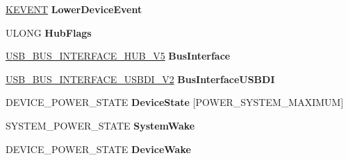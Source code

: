 \begin{DoxyCompactItemize}
\item 
\mbox{\label{struct___u_s_b_h_u_b___f_d_o___e_x_t_e_n_s_i_o_n_a5c8c0a3416b3a681da155dfb287c04f3}} 
\hyperlink{struct___k_e_v_e_n_t}{K\+E\+V\+E\+NT} {\bfseries Lower\+Device\+Event}
\item 
\mbox{\label{struct___u_s_b_h_u_b___f_d_o___e_x_t_e_n_s_i_o_n_ae3d645f0b369886e648f00e9a1433f49}} 
U\+L\+O\+NG {\bfseries Hub\+Flags}
\item 
\mbox{\label{struct___u_s_b_h_u_b___f_d_o___e_x_t_e_n_s_i_o_n_a7f856dc75099d942348ae2af3d2bdf40}} 
\hyperlink{struct___u_s_b___b_u_s___i_n_t_e_r_f_a_c_e___h_u_b___v5}{U\+S\+B\+\_\+\+B\+U\+S\+\_\+\+I\+N\+T\+E\+R\+F\+A\+C\+E\+\_\+\+H\+U\+B\+\_\+\+V5} {\bfseries Bus\+Interface}
\item 
\mbox{\label{struct___u_s_b_h_u_b___f_d_o___e_x_t_e_n_s_i_o_n_a279a7d396328a0efa01a7511ebd47196}} 
\hyperlink{struct___u_s_b___b_u_s___i_n_t_e_r_f_a_c_e___u_s_b_d_i___v2}{U\+S\+B\+\_\+\+B\+U\+S\+\_\+\+I\+N\+T\+E\+R\+F\+A\+C\+E\+\_\+\+U\+S\+B\+D\+I\+\_\+\+V2} {\bfseries Bus\+Interface\+U\+S\+B\+DI}
\item 
\mbox{\label{struct___u_s_b_h_u_b___f_d_o___e_x_t_e_n_s_i_o_n_af2c15a18f9bafb9719e844161cf87b50}} 
D\+E\+V\+I\+C\+E\+\_\+\+P\+O\+W\+E\+R\+\_\+\+S\+T\+A\+TE {\bfseries Device\+State} \mbox{[}P\+O\+W\+E\+R\+\_\+\+S\+Y\+S\+T\+E\+M\+\_\+\+M\+A\+X\+I\+M\+UM\mbox{]}
\item 
\mbox{\label{struct___u_s_b_h_u_b___f_d_o___e_x_t_e_n_s_i_o_n_a5c94c17c707d092c0b9f2a528a721b06}} 
S\+Y\+S\+T\+E\+M\+\_\+\+P\+O\+W\+E\+R\+\_\+\+S\+T\+A\+TE {\bfseries System\+Wake}
\item 
\mbox{\label{struct___u_s_b_h_u_b___f_d_o___e_x_t_e_n_s_i_o_n_a6c2299a89d8181d989f0dc2e2dcc3a4a}} 
D\+E\+V\+I\+C\+E\+\_\+\+P\+O\+W\+E\+R\+\_\+\+S\+T\+A\+TE {\bfseries Device\+Wake}
\item 
\mbox{\label{struct___u_s_b_h_u_b___f_d_o___e_x_t_e_n_s_i_o_n_a2634ddde30756bb175c0a2fad1c4411a}} 

\end{DoxyCompactItemize}
